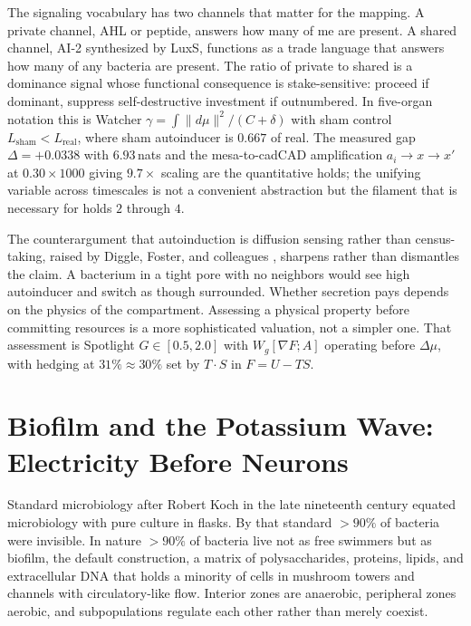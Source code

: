 \documentclass[12pt,a4paper]{article}
\begin{document}
The signaling vocabulary has two channels that matter for the mapping. A private channel, AHL or peptide, answers how many of me are present. A shared channel, AI-2 synthesized by LuxS, functions as a trade language that answers how many of any bacteria are present. The ratio of private to shared is a dominance signal whose functional consequence is stake-sensitive: proceed if dominant, suppress self-destructive investment if outnumbered. In five-organ notation this is Watcher $\gamma = \int \lVert d\mu \rVert^2 / (C + \delta)$ with sham control $L_{\mathrm{sham}} < L_{\mathrm{real}}$, where sham autoinducer is $0.667$ of real. The measured gap $\Delta = +0.0338$ with $6.93$\,nats and the mesa-to-cadCAD amplification $a_i \to x \to x'$ at $0.30 \times 1000$ giving $9.7\times$ scaling are the quantitative holds; the unifying variable across timescales is not a convenient abstraction but the filament that is necessary for holds $2$ through $4$.

The counterargument that autoinduction is diffusion sensing rather than census-taking, raised by Diggle, Foster, and colleagues \cite{diggle2007,foster2013}, sharpens rather than dismantles the claim. A bacterium in a tight pore with no neighbors would see high autoinducer and switch as though surrounded. Whether secretion pays depends on the physics of the compartment. Assessing a physical property before committing resources is a more sophisticated valuation, not a simpler one. That assessment is Spotlight $G \in [0.5,2.0]$ with $W_g[\nabla F; A]$ operating before $\Delta \mu$, with hedging at $31\% \approx 30\%$ set by $T\cdot S$ in $F = U - TS$.

\section{Biofilm and the Potassium Wave: Electricity Before Neurons}
\label{sec:biofilm}

Standard microbiology after Robert Koch in the late nineteenth century equated microbiology with pure culture in flasks. By that standard $>90\%$ of bacteria were invisible. In nature $>90\%$ of bacteria live not as free swimmers but as biofilm, the default construction, a matrix of polysaccharides, proteins, lipids, and extracellular DNA that holds a minority of cells in mushroom towers and channels with circulatory-like flow. Interior zones are anaerobic, peripheral zones aerobic, and subpopulations regulate each other rather than merely coexist.
\end{document}
